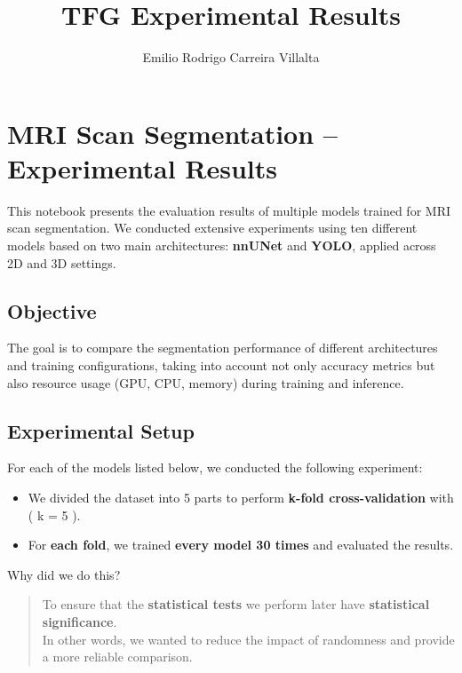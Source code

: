 \documentclass[11pt]{article}
\title{TFG Experimental Results}
\author{Emilio Rodrigo Carreira Villalta}
\providecommand{\tightlist}{%
      \setlength{\itemsep}{0pt}\setlength{\parskip}{0pt}}
\begin{document}
    
    \maketitle
    
    

    \section{MRI Scan Segmentation -- Experimental
Results}\label{mri-scan-segmentation-experimental-results}

This notebook presents the evaluation results of multiple models trained
for MRI scan segmentation. We conducted extensive experiments using ten
different models based on two main architectures: \textbf{nnUNet} and
\textbf{YOLO}, applied across 2D and 3D settings.

\subsection{Objective}\label{objective}

The goal is to compare the segmentation performance of different
architectures and training configurations, taking into account not only
accuracy metrics but also resource usage (GPU, CPU, memory) during
training and inference.

\subsection{Experimental Setup}\label{experimental-setup}

For each of the models listed below, we conducted the following
experiment:

\begin{itemize}
\tightlist
\item
  We divided the dataset into 5 parts to perform \textbf{k-fold
  cross-validation} with ( k = 5 ).
\item
  For \textbf{each fold}, we trained \textbf{every model 30 times} and
  evaluated the results.
\end{itemize}

Why did we do this?

\begin{quote}
To ensure that the \textbf{statistical tests} we perform later have
\textbf{statistical significance}.\\
In other words, we wanted to reduce the impact of randomness and provide
a more reliable comparison.
\end{quote}
\end{document}
